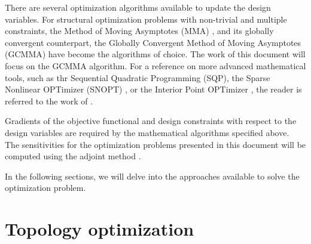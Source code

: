 There are several optimization algorithms available to update the design variables. For structural optimization problems with non-trivial and multiple constraints, the Method of Moving Asymptotes (MMA) \citep{Svanberg:87}, and its globally convergent counterpart, the Globally Convergent Method of Moving Asymptotes (GCMMA) \citep{Svanberg:02} have become the algorithms of choice. The work of this document will focus on the GCMMA algorithm. For a reference on more advanced mathematical tools, such as thr Sequential Quadratic Programming (SQP), the Sparse Nonlinear OPTimizer (SNOPT) \citep{GMS:02}, or the Interior Point OPTimizer \citep{WBL:06}, the reader is referred to the work of \citep{SM:13}.


Gradients of the objective functional and design constraints with respect to the design variables are required by the mathematical algorithms specified above. The sensitivities for the optimization problems presented in this document will be computed using the adjoint method \citep{GP:08,YSL:02}.

In the following sections, we will delve into the approaches available to solve the optimization problem.


\section{Topology optimization}
\label{sec:intro_topology_optimization}

